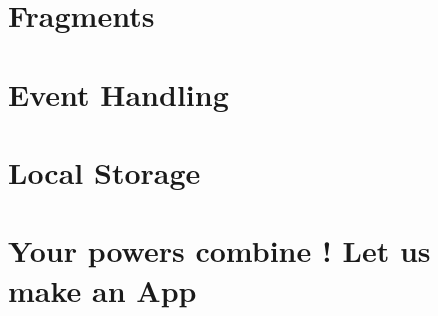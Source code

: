 \documentclass[11pt]{beamer}
\begin{document}



\section{Fragments}
%

\section{Event Handling}
%

\section{Local Storage}
%


\section{Your powers combine ! Let us make an App}
\end{document}
